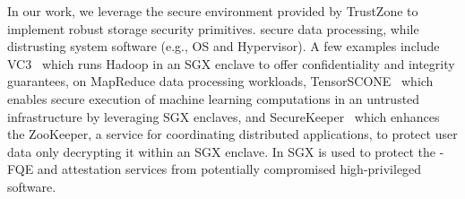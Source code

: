 In our work, we leverage the secure environment provided by TrustZone to implement robust storage security primitives.
secure data processing, while distrusting system software (e.g., OS and Hypervisor).
A few examples include 
VC3~\cite{schuster2015vc3} which runs Hadoop in an SGX enclave to offer confidentiality and integrity guarantees, on MapReduce data processing workloads, 
TensorSCONE~\cite{kunkel2019tensorscone} which enables secure execution of machine learning computations in an untrusted infrastructure by leveraging SGX enclaves, and
SecureKeeper~\cite{brenner2016securekeeper} which enhances the ZooKeeper, a service for coordinating distributed applications, to protect user data only decrypting it within an SGX enclave.
In \project{} SGX is used to protect the \project{}-FQE and attestation services from potentially compromised high-privileged software.
\fi



